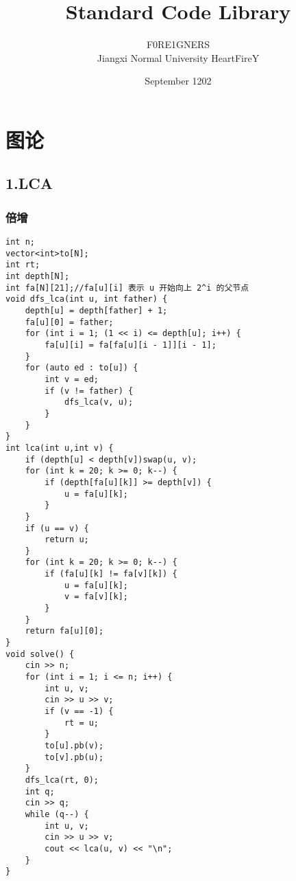 \documentclass[]{article}
\date{}
\title{\vspace{50mm} \huge Standard Code Library \\[20pt]}
\author{F0RE1GNERS \\[10pt] Jiangxi Normal University HeartFireY}
\date{September 1202}
\begin{document}
\begin{titlepage}

\maketitle

\end{titlepage}

\newpage

\renewcommand\labelitemi{$\bullet$}

{
\setcounter{tocdepth}{3}
\tableofcontents
\newpage
}








\hypertarget{ux56feux8bba}{%
\section{图论}\label{ux56feux8bba}}

\hypertarget{lca}{%
\subsection{1.LCA}\label{lca}}

\hypertarget{ux500dux589e}{%
\subsubsection{倍增}\label{ux500dux589e}}

\begin{verbatim}
int n;
vector<int>to[N];
int rt;
int depth[N];
int fa[N][21];//fa[u][i] 表示 u 开始向上 2^i 的父节点
void dfs_lca(int u, int father) {
    depth[u] = depth[father] + 1;
    fa[u][0] = father;
    for (int i = 1; (1 << i) <= depth[u]; i++) {
        fa[u][i] = fa[fa[u][i - 1]][i - 1];
    }
    for (auto ed : to[u]) {
        int v = ed;
        if (v != father) {
            dfs_lca(v, u);
        }
    }
}
int lca(int u,int v) {
    if (depth[u] < depth[v])swap(u, v);
    for (int k = 20; k >= 0; k--) {
        if (depth[fa[u][k]] >= depth[v]) {
            u = fa[u][k];
        }
    }
    if (u == v) {
        return u;
    }
    for (int k = 20; k >= 0; k--) {
        if (fa[u][k] != fa[v][k]) {
            u = fa[u][k];
            v = fa[v][k];
        }
    }
    return fa[u][0];
}
void solve() {
    cin >> n;
    for (int i = 1; i <= n; i++) {
        int u, v;
        cin >> u >> v;
        if (v == -1) {
            rt = u;
        }
        to[u].pb(v);
        to[v].pb(u);
    }
    dfs_lca(rt, 0);
    int q;
    cin >> q;
    while (q--) {
        int u, v;
        cin >> u >> v;
        cout << lca(u, v) << "\n";
    }
}

\end{verbatim}
\end{document}
